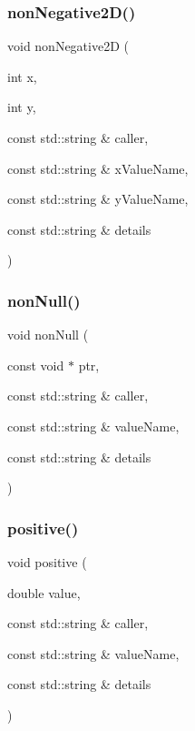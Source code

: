 \subsubsection{\texorpdfstring{non\+Negative2\+D()}{nonNegative2D()}\hspace{0.1cm}{\footnotesize\ttfamily [2/2]}}
{\footnotesize\ttfamily void non\+Negative2D (\begin{DoxyParamCaption}\item[{int}]{x,  }\item[{int}]{y,  }\item[{const std\+::string \&}]{caller,  }\item[{const std\+::string \&}]{x\+Value\+Name,  }\item[{const std\+::string \&}]{y\+Value\+Name,  }\item[{const std\+::string \&}]{details }\end{DoxyParamCaption})}

\mbox{\label{namespacerequire_a3be177878a4f956f7130efa7fe161309}} 
\subsubsection{\texorpdfstring{non\+Null()}{nonNull()}}
{\footnotesize\ttfamily void non\+Null (\begin{DoxyParamCaption}\item[{const void $\ast$}]{ptr,  }\item[{const std\+::string \&}]{caller,  }\item[{const std\+::string \&}]{value\+Name,  }\item[{const std\+::string \&}]{details }\end{DoxyParamCaption})}

\mbox{\label{namespacerequire_a332040c87f61ff35778acdf5ad074d57}} 
\subsubsection{\texorpdfstring{positive()}{positive()}\hspace{0.1cm}{\footnotesize\ttfamily [1/2]}}
{\footnotesize\ttfamily void positive (\begin{DoxyParamCaption}\item[{double}]{value,  }\item[{const std\+::string \&}]{caller,  }\item[{const std\+::string \&}]{value\+Name,  }\item[{const std\+::string \&}]{details }\end{DoxyParamCaption})}

